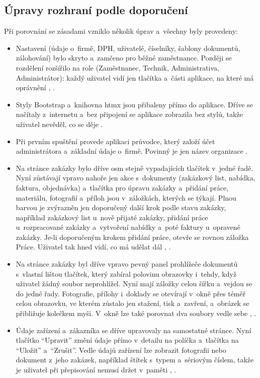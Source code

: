 \subsection{Úpravy rozhraní podle doporučení}\label{sec:ui-upravy}

Při porovnání se zásadami vzniklo několik úprav a~všechny byly provedeny:
\begin{itemize}
\item Nastavení (údaje o~firmě, DPH, uživatelé, číselníky, šablony dokumentů, zálohování) bylo skryto a~zamčeno pro běžné zaměstnance. Později se rozdělení rozšířilo na role (Zaměstnanec, Technik, Administrativa, Administrátor): každý uživatel vidí jen tlačítka a~části aplikace, na které má oprávnění \cite{Nielsen-progressive}, \cite[s.~2331]{Sajedi2011}.
\item Styly Bootstrap a~knihovna htmx jsou přibaleny přímo do aplikace. Dříve se načítaly z~internetu a~bez připojení se aplikace zobrazila bez stylů, takže uživatel nevěděl, co se děje \cite{Nielsen-heuristiky}.
\item Při prvním spuštění provede aplikaci průvodce, který založí účet administrátora a~základní údaje o~firmě. Povinný je jen název organizace \cite{Nielsen-heuristiky}.
\item Na stránce zakázky bylo dříve osm stejně vypadajících tlačítek v~jedné řadě. Nyní zůstávají vpravo nahoře jen akce s~dokumenty (zakázkový list, nabídka, faktura, objednávka) a~tlačítka pro úpravu zakázky a~přidání práce, materiálu, fotografií a~příloh jsou v~záložkách, kterých se týkají. Plnou barvou je zvýrazněn jen doporučený další krok podle stavu zakázky, například zakázkový list u~nově přijaté zakázky, přidání práce u~rozpracované zakázky a~vytvoření nabídky a~poté faktury u~opravené zakázky. Je-li doporučeným krokem přidání práce, otevře se rovnou záložka Práce. Uživatel tak hned vidí, co má udělat dál \cite{Kaplan2021}, \cite{Shneiderman-pravidla}.
\item Na stránce zakázky byl dříve vpravo pevný panel prohlížeče dokumentů s~vlastní lištou tlačítek, který zabíral polovinu obrazovky i~tehdy, když uživatel žádný soubor neprohlížel. Nyní mají záložky celou šířku a~vejdou se do jedné řady. Fotografie, přílohy i~doklady se otevírají v~okně přes téměř celou obrazovku, ve kterém zůstalo jen stažení, tisk a~zavření, a~obrázek se přibližuje kolečkem myši. V~okně lze také porovnat dva soubory vedle sebe \cite{Nielsen-heuristiky}, \cite[s.~2332]{Sajedi2011}.
\item Údaje zařízení a~zákazníka se dříve upravovaly na samostatné stránce. Nyní tlačítko \enquote{Upravit} změní údaje přímo v~detailu na políčka a~tlačítka na \enquote{Uložit} a~\enquote{Zrušit}. Vedle údajů zařízení lze zobrazit fotografii nebo dokument z~jeho zakázek, například štítek s~typem a~sériovým číslem, takže je uživatel při přepisování nemusí držet v~paměti \cite{Shneiderman-pravidla}, \cite{Nielsen-heuristiky}.

\end{itemize}
